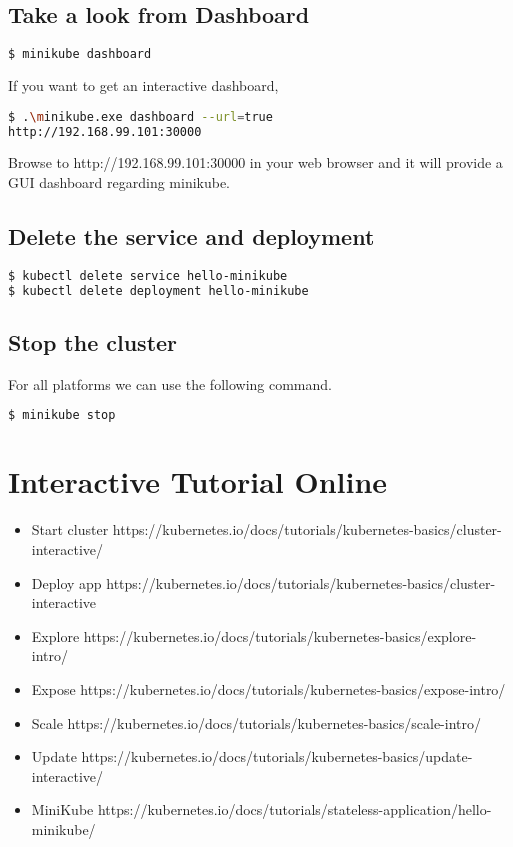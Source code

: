 \subsection{Take a look from Dashboard}

\begin{lstlisting}[language=bash]
$ minikube dashboard
\end{lstlisting}

If you want to get an interactive dashboard,

\begin{lstlisting}[language=bash]
$ .\minikube.exe dashboard --url=true
http://192.168.99.101:30000
\end{lstlisting}

Browse to http://192.168.99.101:30000 in your web browser and it will
provide a GUI dashboard regarding minikube.

\subsection{Delete the service and deployment}

\begin{lstlisting}[language=bash]
$ kubectl delete service hello-minikube
$ kubectl delete deployment hello-minikube
\end{lstlisting}

\subsection{Stop the cluster}

For all platforms we can use the following command.

\begin{lstlisting}[language=bash]
$ minikube stop
\end{lstlisting}

\section{Interactive Tutorial Online}

\begin{itemize}

\item
  Start cluster
  https://kubernetes.io/docs/tutorials/kubernetes-basics/cluster-interactive/
\item
  Deploy app
  https://kubernetes.io/docs/tutorials/kubernetes-basics/cluster-interactive
\item
  Explore
  https://kubernetes.io/docs/tutorials/kubernetes-basics/explore-intro/
\item
  Expose
  https://kubernetes.io/docs/tutorials/kubernetes-basics/expose-intro/
\item
  Scale
  https://kubernetes.io/docs/tutorials/kubernetes-basics/scale-intro/
\item
  Update
  https://kubernetes.io/docs/tutorials/kubernetes-basics/update-interactive/
\item
  MiniKube
  https://kubernetes.io/docs/tutorials/stateless-application/hello-minikube/
\end{itemize}
